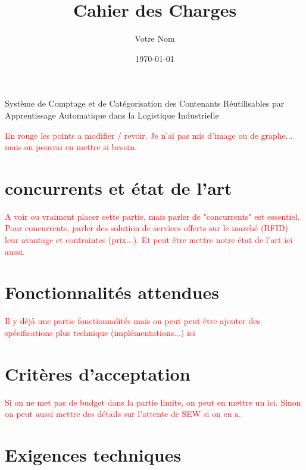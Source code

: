 \documentclass{article}
\title{Cahier des Charges}
\author{Votre Nom}
\date{\today}
\begin{document}
\maketitle

\begin{center}
    \LARGE{Système de Comptage et de Catégorisation des Contenants Réutilisables par Apprentissage Automatique dans la Logistique Industrielle}
\end{center}

\textcolor{red}{En rouge les points a modifier / revoir. Je n'ai pas mis d'image ou de graphe... mais on pourrai en mettre si besoin.}

\tableofcontents
\newpage









\section{concurrents et état de l'art}
\textcolor{red}{A voir ou vraiment placer cette partie, mais parler de "concurrents" est essentiel. Pour concurrents, parler des solution de services offerts sur le marché (RFID) leur avantage et contraintes (prix...). Et peut être mettre notre état de l'art ici aussi.}

\section{Fonctionnalités attendues}

\textcolor{red}{Il y déjà  une partie fonctionnalités mais on peut peut être ajouter des spécifications plus technique (implémentations...) ici}

\section{Critères d'acceptation}

\textcolor{red}{Si on ne met pas de budget dans la partie limite, on peut en mettre un ici. Sinon on peut aussi mettre des détails sur l'attente de SEW si on en a.}

\section{Exigences techniques}
\end{document}
